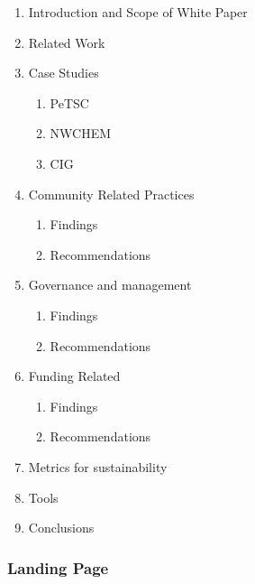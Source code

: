 \begin{enumerate}
\item Introduction and Scope of White Paper 
\item Related Work
\item Case Studies
\begin{enumerate} 
\item PeTSC
\item NWCHEM
\item CIG
\end{enumerate}
\item Community Related Practices
\begin{enumerate} 
\item Findings
\item Recommendations
\end{enumerate}
\item Governance and management
\begin{enumerate} 
\item Findings
\item Recommendations
\end{enumerate}
\item Funding Related
\begin{enumerate} 
\item Findings
\item Recommendations
\end{enumerate}
\item Metrics for sustainability
\item Tools
\item Conclusions
\end{enumerate}

\subsubsection{Landing Page}
